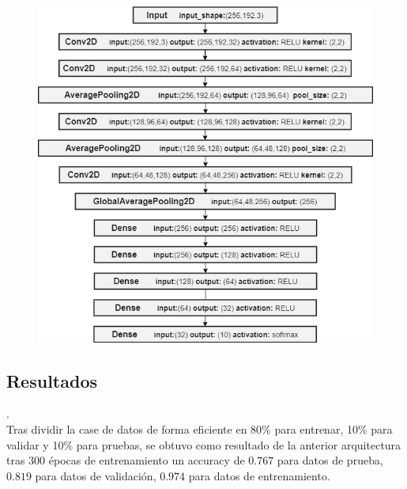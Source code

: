 \documentclass[colorinlistoftodos,twoside,twocolumn,10pt]{article} %
\begin{document}
\begin{figure}
\includegraphics{CNN.png}
\end{figure}

\subsection{Resultados}.\\
Tras dividir la case de datos de forma eficiente en 80\% para entrenar, 10\% para validar y 10\% para pruebas, se obtuvo como resultado de la anterior arquitectura tras 300 épocas de entrenamiento un accuracy de $0.767$ para datos de prueba, $0.819$ para datos de validación, $0.974$ para datos de entrenamiento.
\end{document}
